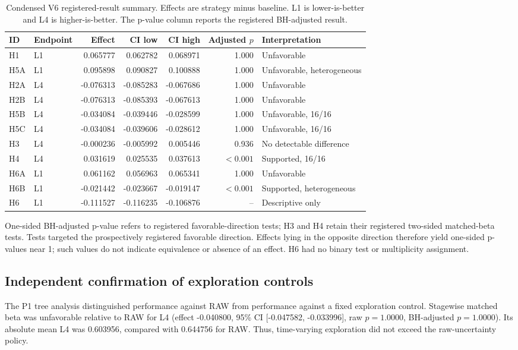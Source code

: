 \documentclass[10pt,twocolumn]{article}
\begin{document}
\FloatBarrier
\begin{table}[!tbp]
\centering
\caption{Condensed V6 registered-result summary. Effects are strategy minus
baseline. L1 is lower-is-better and L4 is higher-is-better. The p-value column
reports the registered BH-adjusted result.}
\label{tab:registered-summary}
\scriptsize
\begin{tabular}{llrrrrl}
\toprule
ID & Endpoint & Effect & CI low & CI high & Adjusted $p$ & Interpretation\\
\midrule
H1  & L1 &  0.065777 &  0.062782 &  0.068971 & 1.000 & Unfavorable\\
H5A & L1 &  0.095898 &  0.090827 &  0.100888 & 1.000 & Unfavorable, heterogeneous\\
H2A & L4 & -0.076313 & -0.085283 & -0.067686 & 1.000 & Unfavorable\\
H2B & L4 & -0.076313 & -0.085393 & -0.067613 & 1.000 & Unfavorable\\
H5B & L4 & -0.034084 & -0.039446 & -0.028599 & 1.000 & Unfavorable, 16/16\\
H5C & L4 & -0.034084 & -0.039606 & -0.028612 & 1.000 & Unfavorable, 16/16\\
H3  & L4 & -0.000236 & -0.005992 &  0.005446 & 0.936 & No detectable difference\\
H4  & L4 &  0.031619 &  0.025535 &  0.037613 & $<0.001$ & Supported, 16/16\\
H6A & L1 &  0.061162 &  0.056963 &  0.065341 & 1.000 & Unfavorable\\
H6B & L1 & -0.021442 & -0.023667 & -0.019147 & $<0.001$ & Supported, heterogeneous\\
H6  & L1 & -0.111527 & -0.116235 & -0.106876 & -- & Descriptive only\\
\bottomrule
\end{tabular}
\begin{minipage}{.98\linewidth}\footnotesize\smallskip
One-sided BH-adjusted p-value refers to registered favorable-direction tests;
H3 and H4 retain their registered two-sided matched-beta tests. Tests targeted
the prospectively registered favorable direction. Effects lying in the
opposite direction therefore yield one-sided p-values near 1; such values do
not indicate equivalence or absence of an effect. H6 had no binary test or
multiplicity assignment.
\end{minipage}
\end{table}



\subsection{Independent confirmation of exploration controls}
The P1 tree analysis distinguished performance against RAW from performance against a fixed exploration control. Stagewise matched beta was unfavorable relative to RAW for L4 (effect -0.040800, 95\% CI [-0.047582, -0.033996], raw $p=1.0000$, BH-adjusted $p=1.0000$). Its absolute mean L4 was 0.603956, compared with 0.644756 for RAW. Thus, time-varying exploration did not exceed the raw-uncertainty policy.
\end{document}
